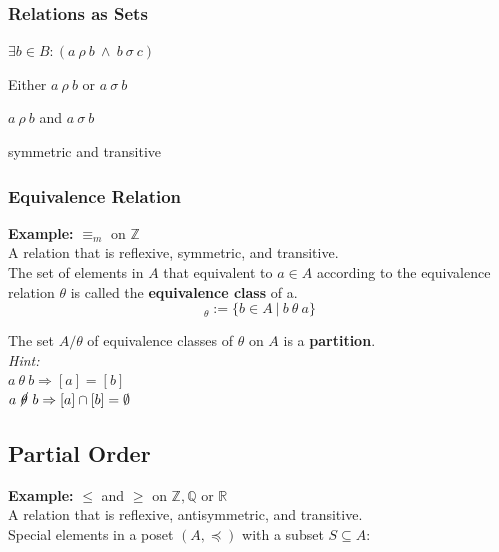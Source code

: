 \documentclass[11pt]{article}
\begin{document}
\subsubsection{Relations as Sets}

\begin{description}[labelindent=16pt,style=multiline,leftmargin=4.5cm, noitemsep]
	\item[$a\ \rho\sigma\ b$:] $\exists b\in B: (a\ \rho\ b\ \land\ b\ \sigma\ c)$
	\item[$a\ (\rho\cup\sigma)\ b$:] Either $a\ \rho\ b$ or $a\ \sigma\ b$
	\item[$a\ (\rho\cap\sigma)\ b$:] $a\ \rho\ b$ and $a\ \sigma\ b$
	\item[The empty set $\emptyset$:] symmetric and transitive
\end{description}

\subsubsection{Equivalence Relation}
\textbf{Example:} $\equiv_m$ on $\mathbb{Z}$\\ 
A relation that is reflexive, symmetric, and transitive.\\

The set of elements in $A$ that equivalent to $a \in A$ according to the equivalence relation $\theta$ is called the \textbf{equivalence class} of a.
\begin{equation*}
	[a]_\theta := \{b \in A\ |\ b\ \theta\ a \}
\end{equation*}

The set $A/\theta$ of equivalence classes of $\theta$ on $A$ is a \textbf{partition}. \\

\emph{Hint:}\\
$a\ \theta\ b \Rightarrow [a] = [b]$\\
$a\ \cancel{\theta}\ b \Rightarrow [a] \cap [b] = \emptyset$

\subsection{Partial Order}
\textbf{Example:} $\leq$ and $\geq$ on $\mathbb{Z}, \mathbb{Q}$ or $\mathbb{R}$\\ 
A relation that is reflexive, antisymmetric, and transitive. \\

Special elements in a poset $(A, \preceq)$ with a subset $S \subseteq A$:
\end{document}
